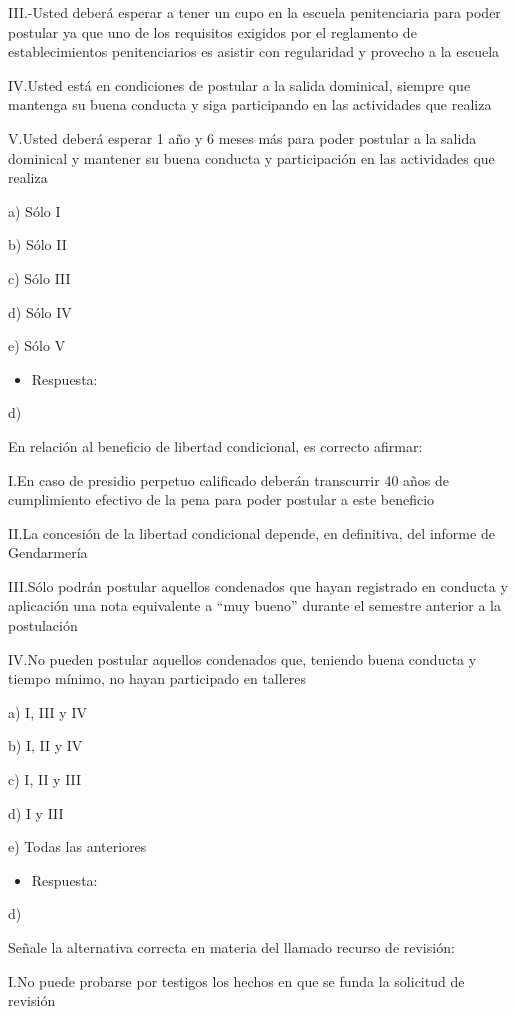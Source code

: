 \documentclass[letterpaper, 11pt]{article}
\begin{document}
III.-Usted deberá esperar a tener un cupo en la escuela penitenciaria para poder
postular ya que uno de los requisitos exigidos por el reglamento de
establecimientos penitenciarios es asistir con regularidad y provecho a la escuela

IV.Usted está en condiciones de postular a la salida dominical, siempre que mantenga
su buena conducta y siga participando en las actividades que realiza

V.Usted deberá esperar 1 año y 6 meses más para poder postular a la salida
dominical y mantener su buena conducta y participación en las actividades que
realiza

a) Sólo I

b) Sólo II

c) Sólo III

d) Sólo IV

e) Sólo V

\begin{itemize}
\item Respuesta:
\end{itemize}
d)


En relación al beneficio de libertad condicional, es correcto afirmar:

I.En caso de presidio perpetuo calificado deberán transcurrir 40 años de
cumplimiento efectivo de la pena para poder postular a este beneficio

II.La concesión de la libertad condicional depende, en definitiva, del informe de
Gendarmería

III.Sólo podrán postular aquellos condenados que hayan registrado en conducta y
aplicación una nota equivalente a “muy bueno” durante el semestre anterior a la
postulación

IV.No pueden postular aquellos condenados que, teniendo buena conducta y tiempo
mínimo, no hayan participado en talleres


a) I, III y IV

b) I, II y IV

c) I, II y III

d) I y III

e) Todas las anteriores

\begin{itemize}
\item Respuesta:
\end{itemize}
d)

Señale la alternativa correcta en materia del llamado recurso de revisión:

I.No puede probarse por testigos los hechos en que se funda la solicitud de revisión
\end{document}
